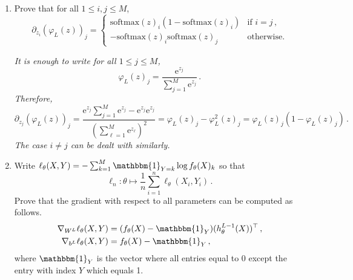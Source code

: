 \documentclass[a4paper,10pt,fleqn]{article}
\newcommand{\eqsp}{\,}
\newcommand{\rme}{\ensuremath{\mathrm{e}}}
\newcommand{\1}{\ensuremath{\mathbbm{1}}}
\begin{document}
\begin{enumerate}
\item Prove that  for all $1\leqslant i,j\leqslant M$,
$$
\partial_{z_i}(\varphi_L(z))_j =  \left\{
    \begin{array}{ll}
        \mathrm{softmax}(z)_i (1-\mathrm{softmax}(z)_i ) & \mbox{if } i=j\eqsp,\\
        - \mathrm{softmax}(z)_i \mathrm{softmax}(z)_j & \mbox{otherwise.}
    \end{array}
\right.
$$

\vspace{.2cm}

{\em
It is enough to write for all $1\leqslant j\leqslant M$,
$$
\varphi_L(z)_j = \frac{\rme^{z_j}}{\sum_{j=1}^M\rme^{z_j}}\eqsp.
$$
Therefore, 
$$
\partial_{z_j}(\varphi_L(z))_j =  \frac{\rme^{z_j}\sum_{j=1}^M\rme^{z_j}-\rme^{z_j}\rme^{z_j}}{\left(\sum_{\ell=1}^M\rme^{z_\ell}\right)^2} = \varphi_L(z)_j -\varphi^2_L(z)_j =  \varphi_L(z)_j (1-\varphi_L(z)_j )\eqsp. 
$$
The case $i\neq j$ can be dealt with similarly.
}

\item Write $\ell_{\theta}(X,Y) =  -\sum_{k=1}^{M} \1_{Y=k}\log f_{\theta}(X)_k$ so that 
$$
\ell_n:\theta \mapsto \frac{1}{n} \sum_{i=1}^n \ell_{\theta}(X_i,Y_i)\eqsp. 
$$
Prove that  the gradient with respect to all parameters can be computed as follows.
\begin{align*}
\nabla_{W^L} \ell_{\theta}(X,Y) &= (f_{\theta}(X) - \1_Y)(h_{\theta}^{L-1}(X))^\top\eqsp,\\
\nabla_{b^L} \ell_{\theta}(X,Y) &= f_{\theta}(X) - \1_Y\eqsp,
\end{align*}
where $\1_Y$ is the vector where all entries equal to 0 except the entry with index $Y$ which equals 1.

\vspace{.2cm}


\end{enumerate}
\end{document}

